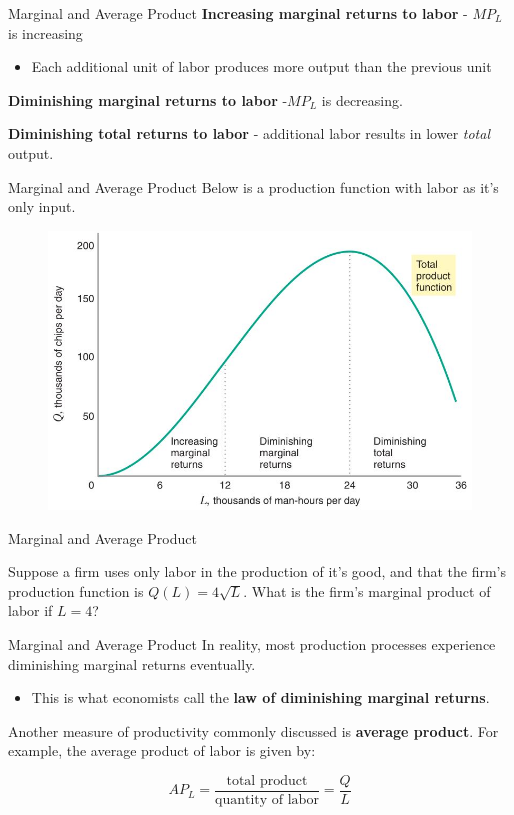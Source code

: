 \documentclass[11pt,t]{beamer}
\begin{document}
\begin{frame}{Marginal and Average Product}
  \textbf{Increasing marginal returns to labor} - $MP_L$ is increasing
  \bigskip
  \begin{itemize}
    \item Each additional unit of labor produces more output than the previous unit
  \end{itemize}

  \pause\bigskip
  \textbf{Diminishing marginal returns to labor} -$MP_L$ is decreasing.

  \bigskip
  \textbf{Diminishing total returns to labor} - additional labor results in lower \textit{total} output.
\end{frame}

\begin{frame}{Marginal and Average Product}
  Below is a production function with labor as it's only input.
  \begin{figure}
    \includegraphics[width=0.8\linewidth]{figures/fig6_2.jpg}
  \end{figure}
\end{frame}

\begin{frame}{Marginal and Average Product}
  
  \bigskip
  Suppose a firm uses only labor in the production of it's good, and that the firm's production function is $Q(L) = 4\sqrt{L}$. What is the firm's marginal product of labor if $L=4$?

  
\end{frame}

\begin{frame}{Marginal and Average Product}
  In reality, most production processes experience diminishing marginal returns eventually.
  
  \bigskip
  \begin{itemize}
    \item This is what economists call the \textbf{law of diminishing marginal returns}.
  \end{itemize}

  \pause\bigskip
  Another measure of productivity commonly discussed is \textbf{average product}. For example, the average product of labor is given by:
  
  \begin{equation*}
    AP_L = \frac{\text{total product}}{\text{quantity of labor}} = \frac{Q}{L}
  \end{equation*}
\end{frame}
\end{document}
